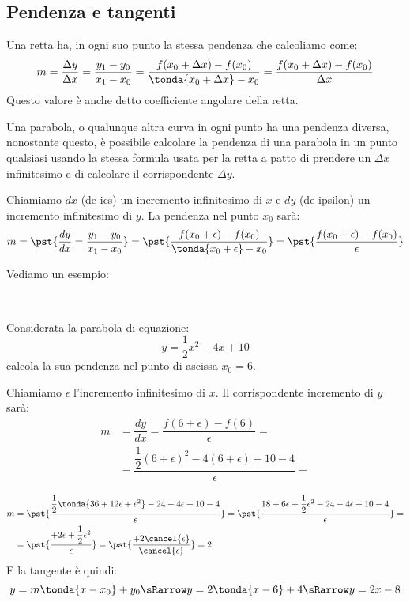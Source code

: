 \subsection{Pendenza e tangenti}
\label{subsec:insnum_tangenti_parabola}


Una retta ha, in ogni suo punto la stessa pendenza che calcoliamo come:
\[m=\dfrac{\Delta y}{\Delta x}=\dfrac{y_1-y_0}{x_1-x_0}=
\dfrac{f(x_0+\Delta x)-f(x_0)}{\tonda{x_0+\Delta x}-x_0}=
\dfrac{f(x_0+\Delta x)-f(x_0)}{\Delta x}\]
Questo valore è anche detto coefficiente angolare della retta.

Una parabola, o qualunque altra curva in ogni punto ha una pendenza 
diversa, nonostante questo, è possibile calcolare la pendenza di una 
parabola in un punto qualsiasi usando la stessa formula usata per la retta 
a patto di prendere un \(\Delta x\) infinitesimo e di calcolare il 
corrispondente \(\Delta y\).

Chiamiamo \(d x\) (de ics) un incremento infinitesimo di \(x\) e 
\(d y\) (de ipsilon) un incremento infinitesimo di \(y\).
La pendenza nel punto \(x_0\) sarà:
\[m=\pst{\dfrac{d y}{d x}=\dfrac{y_1-y_0}{x_1-x_0}}=
    \pst{\dfrac{f(x_0+\epsilon)-f(x_0)}{\tonda{x_0+\epsilon}-x_0}}=
    \pst{\dfrac{f(x_0+\epsilon)-f(x_0)}{\epsilon}}\]



Vediamo un esempio:

\begin{esempio}
{~}

\begin{minipage}{.49\textwidth}
Considerata la parabola di equazione:
\[y=\dfrac{1}{2}x^2-4x+10\] 
calcola la sua pendenza nel punto di ascissa \(x_0=6\).

Chiamiamo \(\epsilon\) l'incremento infinitesimo di \(x\).
Il corrispondente incremento di \(y\) sarà: 
\begin{align*}
m&=\dfrac{d y}{d x}=
\dfrac{f(6+\epsilon)-f(6)}{\epsilon}=\\
 &=\dfrac{\dfrac{1}{2}(6+\epsilon)^2-4(6+\epsilon)+10-4}{\epsilon}=
\end{align*}
\end{minipage}
\hfill
\begin{minipage}{.49\textwidth}
\begin{center}\pendenza\end{center}
\end{minipage}
\begin{align*}
m&=\pst{\dfrac{\dfrac{1}{2}\tonda{36+12\epsilon+\epsilon^2}-24-4\epsilon+10
              -4}
             {\epsilon}}=
   \pst{\dfrac{18+6\epsilon+\dfrac{1}{2}\epsilon^2-24-4\epsilon+10-4}
             {\epsilon}}=\\
 &=\pst{\dfrac{+2\epsilon+\dfrac{1}{2}\epsilon^2}{\epsilon}}=
   \pst{\dfrac{+2\cancel{\epsilon}}{\cancel{\epsilon}}}=2
\end{align*}
E la tangente è quindi:
\[y=m \tonda{x-x_0}+y_0 \sRarrow y=2 \tonda{x-6}+4 \sRarrow y=2x-8\]

\end{esempio}

